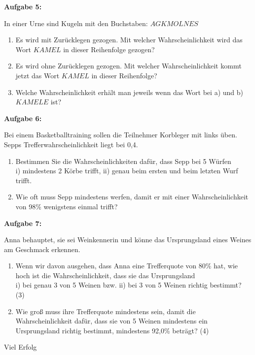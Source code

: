 \documentclass[a4paper,12pt]{article}
\newcommand{\Aufgabe}[1]{
  {
  \vspace*{0.5cm}
  \textsf{\textbf{Aufgabe #1}}
  \vspace*{0.2cm}
  
  }
}
\begin{document}
\Aufgabe{5:} 
In einer Urne sind Kugeln mit den Buchstaben: $AGKMOLNES$
\begin{enumerate}[label={\alph*)}] 
  \item Es wird mit Zurücklegen gezogen. Mit welcher Wahrscheinlichkeit wird das Wort $KAMEL$ in dieser Reihenfolge gezogen?
  \item Es wird ohne Zurücklegen gezogen. Mit welcher Wahrscheinlichkeit kommt jetzt das Wort $KAMEL$ in dieser Reihenfolge?
  \item Welche Wahrscheinlichkeit erhält man jeweils wenn das Wort bei a) und b) $KAMELE$ ist?
\end{enumerate}


\Aufgabe{6:} 
Bei einem Basketballtraining sollen die Teilnehmer Korbleger mit links üben. Sepps Trefferwahrscheinlichkeit liegt bei 0,4.
\begin{enumerate}[label={\alph*)}] 
  \item Bestimmen Sie die Wahrscheinlichkeiten dafür, dass Sepp bei 5 Würfen\\
    i) mindestens 2 Körbe trifft,  ii) genau beim ersten und beim letzten Wurf trifft.
  \item Wie oft muss Sepp mindestens werfen, damit er mit einer Wahrscheinlichkeit von 98\% wenigstens einmal trifft?
\end{enumerate}



\Aufgabe{7:} 
Anna behauptet, sie sei Weinkennerin und könne das Ursprungsland eines Weines am Geschmack erkennen.
\begin{enumerate}[label={\alph*)}] 
  \item Wenn wir davon ausgehen, dass Anna eine Trefferquote von 80\% hat, wie hoch ist die Wahrscheinlichkeit, dass sie das Ursprungsland\\
    i) bei genau 3 von 5 Weinen bzw. 
    ii) bei 3 von 5 Weinen richtig bestimmt? (3)
  \item Wie groß muss ihre Trefferquote mindestens sein, damit die Wahrscheinlichkeit dafür, dass sie von 5 Weinen mindestens ein Ursprungsland richtig bestimmt, mindestens 92,0\% beträgt? (4)
\end{enumerate}

\vspace{2cm}

\centerline{Viel Erfolg}
\end{document}
